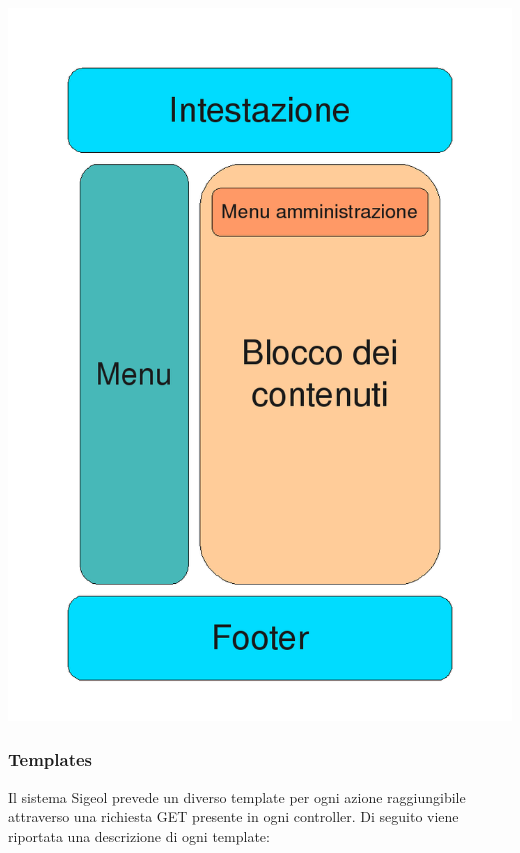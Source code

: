 \documentclass[11pt,a4paper]{article}
\begin{document}
\includegraphics[scale=0.50]{images/layout.png}
\subsubsection{Templates}
Il sistema Sigeol prevede un diverso template per ogni azione raggiungibile attraverso una richiesta GET presente in ogni controller. Di seguito viene riportata una descrizione di ogni template:
\end{document}
